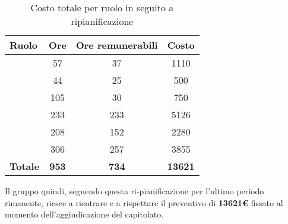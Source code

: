 \begin{table}[h]
	\begin{center}
		\begin{tabular}{|l|c|c|c|}
			\hline
			\textbf{Ruolo}	& \textbf{Ore} &	\textbf{Ore remunerabili}	 &\textbf{Costo} \\
			\hline
			\textit{\Pm}	&	57	&	37	&	1110	\\
			\hline
			\textit{\Am}	&	44	&	25	&	500	\\
			\hline
			\textit{\An}	&	105	&	30	&	750	\\
			\hline
			\textit{\Prog}	&	233	&	233	&	5126	\\
			\hline
			\textit{\Progr}	&	208	&	152	&	2280	\\
			\hline
			\textit{\Ver}	&	306	&	257	&	3855	\\
			\hline
			\textbf{Totale}	&	\textbf{953} & \textbf{734} & \textbf{13621}	\\
			\hline
		\end{tabular}
	\end{center}
	\caption{Costo totale per ruolo in seguito a ripianificazione}
\end{table}

Il gruppo quindi, seguendo questa ri-pianificazione per l'ultimo periodo rimanente, riesce a rientrare e a rispettare il preventivo di \textbf{13621€} fissato al momento dell'aggiudicazione del capitolato.